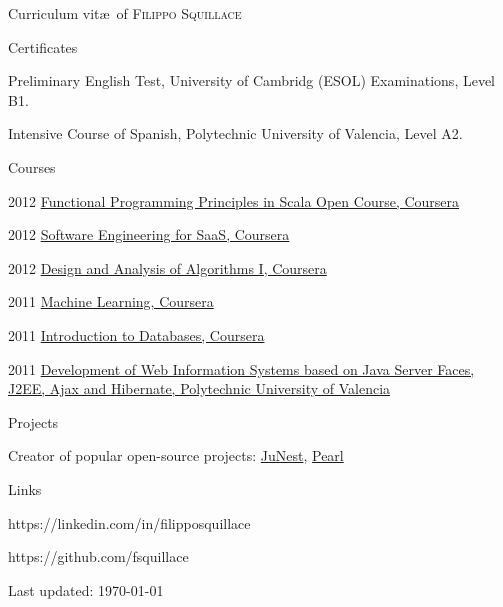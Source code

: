 \documentclass[10pt,a4paper]{article}
\begin{document}
\begin{cv}{\huge{Curriculum vit\ae~of \textsc{Filippo Squillace}}}
\begin{minipage}[t]{0.33\textwidth}
\begin{cvlist}{Certificates}
        \item[\textbullet] Preliminary English Test, University of Cambridg
          (ESOL) Examinations, Level B1.
        \item[\textbullet] Intensive Course of Spanish, Polytechnic University
          of Valencia, Level A2.
      \end{cvlist}
      \begin{cvlist}{Courses}
        \item[2012] \href{https://class.coursera.org/progfun-2012-001/class/index}{Functional Programming Principles in Scala Open Course, Coursera}
        \item[2012] \href{https://www.coursera.org/saas/class/index}{Software Engineering for SaaS, Coursera}
        \item[2012] \href{https://class.coursera.org/algo/class/index}{Design and Analysis of Algorithms I, Coursera}
        \item[2011] \href{http://www.ml-class.org/course/class/index}{Machine Learning, Coursera}
        \item[2011] \href{http://www.db-class.org/course/class/index}{Introduction to Databases, Coursera}
        \item[2011] \href{http://www.cfp.upv.es/formacion-permanente/index/index.jsp}{Development of Web Information Systems based on Java Server Faces, J2EE, Ajax and Hibernate, Polytechnic University of Valencia}
      \end{cvlist}
      \begin{cvlist}{Projects}
        \item[\textbullet] Creator of popular open-source projects: \href{https://github.com/fsquillace/junest}{JuNest}, \href{https://github.com/pearl-core/pearl}{Pearl}
      \end{cvlist}
      \begin{cvlist}{Links}
        \item[\textbullet] \footnotesize{https://linkedin.com/in/filipposquillace}
        \item[\textbullet] \footnotesize{https://github.com/fsquillace}
      \end{cvlist}
    \end{minipage}
  \end{cv}
  \begin{center}
    \footnotesize{Last updated: \today}
  \end{center}
\end{document}
